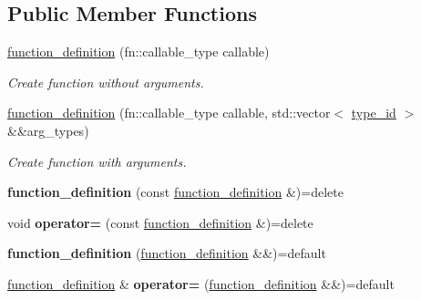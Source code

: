 \subsection*{Public Member Functions}
\begin{DoxyCompactItemize}
\item 
\mbox{\hyperlink{classdice_1_1function__definition_a002ceae34d8dba6d5a83da97fad28c62}{function\+\_\+definition}} (fn\+::callable\+\_\+type callable)
\begin{DoxyCompactList}\small\item\em Create function without arguments. \end{DoxyCompactList}\item 
\mbox{\hyperlink{classdice_1_1function__definition_a8722346987d1cc191032dffb5e912f6f}{function\+\_\+definition}} (fn\+::callable\+\_\+type callable, std\+::vector$<$ \mbox{\hyperlink{value_8hpp_ab9af7d8ecc381e026ca4d07a745f23eb}{type\+\_\+id}} $>$ \&\&arg\+\_\+types)
\begin{DoxyCompactList}\small\item\em Create function with arguments. \end{DoxyCompactList}\item 
\mbox{\label{classdice_1_1function__definition_a3992982ebfe549c336f118fef8d194ff}} 
{\bfseries function\+\_\+definition} (const \mbox{\hyperlink{classdice_1_1function__definition}{function\+\_\+definition}} \&)=delete
\item 
\mbox{\label{classdice_1_1function__definition_a74d45bd0799e47a9553bf0956ee81b6e}} 
void {\bfseries operator=} (const \mbox{\hyperlink{classdice_1_1function__definition}{function\+\_\+definition}} \&)=delete
\item 
\mbox{\label{classdice_1_1function__definition_aa7ef0a9eaf695e23c8a54f8954e3535b}} 
{\bfseries function\+\_\+definition} (\mbox{\hyperlink{classdice_1_1function__definition}{function\+\_\+definition}} \&\&)=default
\item 
\mbox{\label{classdice_1_1function__definition_a7a06f9ea590076435ad36d0df6650aef}} 
\mbox{\hyperlink{classdice_1_1function__definition}{function\+\_\+definition}} \& {\bfseries operator=} (\mbox{\hyperlink{classdice_1_1function__definition}{function\+\_\+definition}} \&\&)=default

\end{DoxyCompactItemize}
